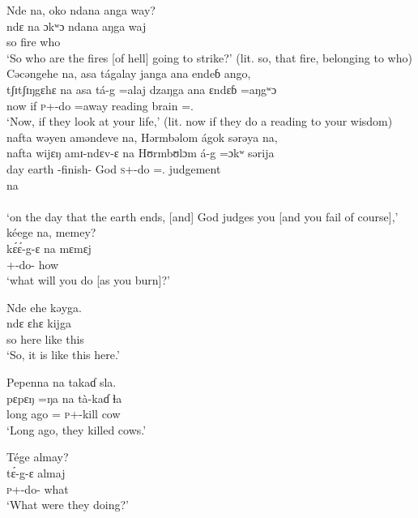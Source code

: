 \ea Nde  na,  oko  ndana  anga  way?\\
 \gll ndɛ  na   ɔkʷɔ   ndana   aŋga   waj\\
 so  {\PSP}  fire  {\DEM}  {\POSS}  who\\
 \glt ‘So who are the fires [of hell] going to strike?’ (lit. so, that fire, belonging to who)
 \z
\clearpage
\ea Cəcəngehe  na,  asa  tágalay  janga  ana  endeɓ  ango,      \\
 \gll tʃɪtʃɪŋgɛhɛ    na  asa  tá-g    =alaj      dzaŋga   ana    ɛndɛɓ      =aŋgʷɔ\\
 now            {\PSP}    if     \textsc{p}+{\IFV}-do  =away  reading  {\DAT}   brain  ={\twoS}.{\POSS}  \\
 \glt ‘Now, if they look at your life,’ (lit. now if they do a reading to your wisdom)\\
 
 \medskip
   nafta  wəyen  aməndeve  na,  Hərmbəlom  ágok  sərəya  na,\\
 \gll nafta   wijɛŋ  amɪ-ndɛv-ɛ  na  Hʊrmbʊlɔm  á-g     =ɔkʷ sərija\\ 
 day     earth    {\DEP}-finish-{\CL}   {\PSP}    God           \textsc{s}+{\IFV}-do ={\twoS}.{\IO}   judgement\\  
 
 \medskip
 \gll na\\
      {\PSP}\\
 \glt ‘on the day that the earth ends, [and] God judges you [and you fail of course],’\\
 
 \medskip
  kéege  na,  memey?\\
 \gll k\'ɛ\'ɛ-g-ɛ    na  mɛmɛj\\
 {\twoS}+{\POT}-do-{\CL}  {\PSP}  how\\
 \glt ‘what will you do [as you burn]?’
 \z


\ea Nde  ehe  kəyga.\\
 \gll ndɛ  ɛhɛ   kijga\\
 so  here  {like this}\\
 \glt ‘So, it is like this here.’ 
 \z

\ea Pepenna  na  takaɗ  sla.\\
 \gll pɛpɛŋ  =ŋa   na  tà-kaɗ ɬa \\
{long ago}  ={\ADV}  {\PSP}  \textsc{p}+{\PFV}-kill  cow  \\
 \glt ‘Long ago, they killed cows.’
 \z

\ea Tége  almay?\\
 \gll t\'ɛ-g-ɛ     almaj\\
 \textsc{p}+{\IFV}{}-do-{\CL}  what\\
 \glt ‘What were they doing?’
 \z

